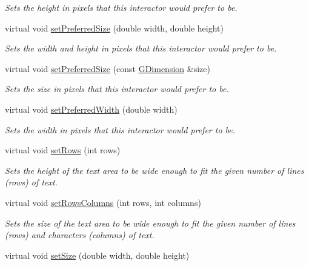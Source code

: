 \begin{DoxyCompactItemize}
\begin{DoxyCompactList}\small\item\em Sets the height in pixels that this interactor would prefer to be. \end{DoxyCompactList}\item 
virtual void \mbox{\hyperlink{classsgl_1_1GInteractor_a042c5ae19430d765ef552371cae3632c}{set\+Preferred\+Size}} (double width, double height)
\begin{DoxyCompactList}\small\item\em Sets the width and height in pixels that this interactor would prefer to be. \end{DoxyCompactList}\item 
virtual void \mbox{\hyperlink{classsgl_1_1GInteractor_aa22d9be4bc0e078bb0ea69b0fc9d7c75}{set\+Preferred\+Size}} (const \mbox{\hyperlink{structsgl_1_1GDimension}{G\+Dimension}} \&size)
\begin{DoxyCompactList}\small\item\em Sets the size in pixels that this interactor would prefer to be. \end{DoxyCompactList}\item 
virtual void \mbox{\hyperlink{classsgl_1_1GInteractor_a3db429ab2fa52efd187eec0ed8cdd9f2}{set\+Preferred\+Width}} (double width)
\begin{DoxyCompactList}\small\item\em Sets the width in pixels that this interactor would prefer to be. \end{DoxyCompactList}\item 
virtual void \mbox{\hyperlink{classsgl_1_1GTextArea_a508bbe326657af6d3add84deb4595989}{set\+Rows}} (int rows)
\begin{DoxyCompactList}\small\item\em Sets the height of the text area to be wide enough to fit the given number of lines (rows) of text. \end{DoxyCompactList}\item 
virtual void \mbox{\hyperlink{classsgl_1_1GTextArea_a15142a18598662167760b35e58be90b1}{set\+Rows\+Columns}} (int rows, int columns)
\begin{DoxyCompactList}\small\item\em Sets the size of the text area to be wide enough to fit the given number of lines (rows) and characters (columns) of text. \end{DoxyCompactList}\item 
virtual void \mbox{\hyperlink{classsgl_1_1GInteractor_aca25d49481f9bf5fc8f7df4c086c4ce7}{set\+Size}} (double width, double height)

\end{DoxyCompactItemize}
